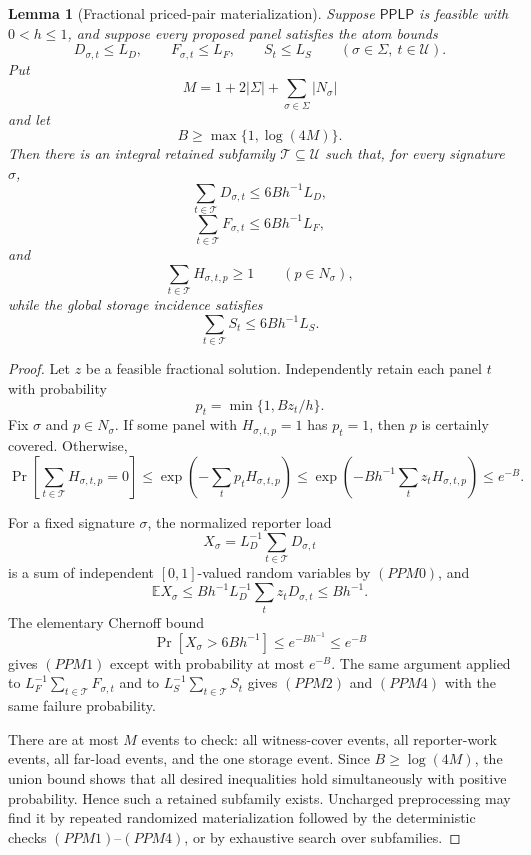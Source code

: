 \documentclass[10pt]{article}
\newtheorem{lemma}[theorem]{Lemma}
\theoremstyle{definition}
\newcommand{\E}{\mathbb{E}}
\begin{document}
\begin{lemma}[Fractional priced-pair materialization]
   \label{lem:fractional-priced-pair-materialization}
   Suppose \(\mathsf{PPLP}\) is feasible with \(0<h\le1\), and suppose every
   proposed panel satisfies the atom bounds
   \[
      D_{\sigma,t}\le L_D,\qquad
      F_{\sigma,t}\le L_F,\qquad
      S_t\le L_S
      \qquad(\sigma\in\Sigma,\ t\in\mathcal U).
      \tag{PPM0}
   \]
   Put
   \[
      M=1+2|\Sigma|+\sum_{\sigma\in\Sigma}|N_\sigma|
   \]
   and let
   \[
      B\ge \max\{1,\log(4M)\}.
   \]
   Then there is an integral retained subfamily
   \(\mathcal T\subseteq\mathcal U\) such that, for every signature
   \(\sigma\),
   \[
      \sum_{t\in\mathcal T}D_{\sigma,t}
      \le 6Bh^{-1}L_D,
      \tag{PPM1}
   \]
   \[
      \sum_{t\in\mathcal T}F_{\sigma,t}
      \le 6Bh^{-1}L_F,
      \tag{PPM2}
   \]
   and
   \[
      \sum_{t\in\mathcal T}H_{\sigma,t,p}\ge1
      \qquad(p\in N_\sigma),
      \tag{PPM3}
   \]
   while the global storage incidence satisfies
   \[
      \sum_{t\in\mathcal T}S_t\le6Bh^{-1}L_S.
      \tag{PPM4}
   \]
\end{lemma}

\begin{proof}
   Let \(z\) be a feasible fractional solution.  Independently retain each
   panel \(t\) with probability
   \[
      p_t=\min\{1,Bz_t/h\}.
   \]
   Fix \(\sigma\) and \(p\in N_\sigma\).  If some panel with
   \(H_{\sigma,t,p}=1\) has \(p_t=1\), then \(p\) is certainly covered.
   Otherwise,
   \[
      \Pr\left[\sum_{t\in\mathcal T}H_{\sigma,t,p}=0\right]
      \le
      \exp\left(-\sum_t p_tH_{\sigma,t,p}\right)
      \le
      \exp\left(-Bh^{-1}\sum_tz_tH_{\sigma,t,p}\right)
      \le e^{-B}.
      \tag{PPM5}
   \]

   For a fixed signature \(\sigma\), the normalized reporter load
   \[
      X_\sigma=L_D^{-1}\sum_{t\in\mathcal T}D_{\sigma,t}
   \]
   is a sum of independent \([0,1]\)-valued random variables by \((PPM0)\),
   and
   \[
      \E X_\sigma
      \le
      Bh^{-1}L_D^{-1}\sum_tz_tD_{\sigma,t}
      \le Bh^{-1}.
   \]
   The elementary Chernoff bound
   \[
      \Pr[X_\sigma>6Bh^{-1}]\le e^{-Bh^{-1}}\le e^{-B}
   \]
   gives \((PPM1)\) except with probability at most \(e^{-B}\).  The same
   argument applied to \(L_F^{-1}\sum_{t\in\mathcal T}F_{\sigma,t}\) and to
   \(L_S^{-1}\sum_{t\in\mathcal T}S_t\) gives \((PPM2)\) and \((PPM4)\) with
   the same failure probability.

   There are at most \(M\) events to check: all witness-cover events, all
   reporter-work events, all far-load events, and the one storage event.  Since
   \(B\ge\log(4M)\), the union bound shows that all desired inequalities hold
   simultaneously with positive probability.  Hence such a retained subfamily
   exists.  Uncharged preprocessing may find it by repeated randomized
   materialization followed by the deterministic checks \((PPM1)\)--\((PPM4)\),
   or by exhaustive search over subfamilies.
\end{proof}
\end{document}
